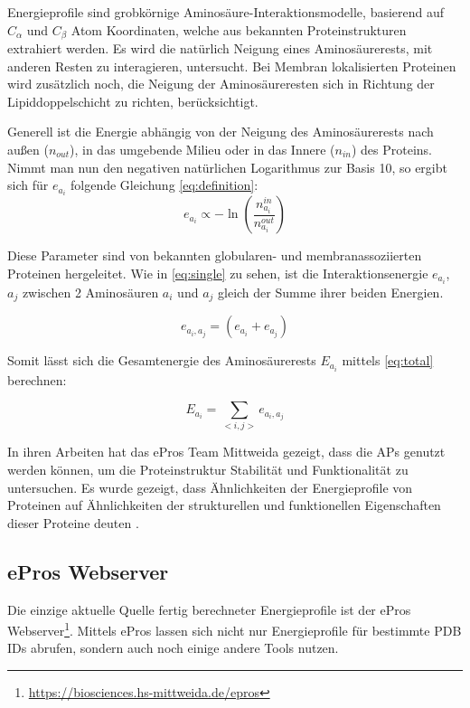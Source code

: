 Energieprofile sind grobkörnige Aminosäure-Interaktionsmodelle, basierend auf $C_{\alpha}$ und $C_{\beta}$ Atom Koordinaten, welche aus bekannten Proteinstrukturen extrahiert werden. Es wird die natürlich Neigung eines Aminosäurerests, mit anderen Resten zu interagieren, untersucht. Bei Membran lokalisierten Proteinen wird zusätzlich noch, die Neigung der Aminosäureresten sich in Richtung der Lipiddoppelschicht zu richten, berücksichtigt. 

Generell ist die Energie abhängig von der Neigung des Aminosäurerests nach außen ($n_{out}$), in das umgebende Milieu oder in das Innere ($n_{in}$) des Proteins. Nimmt man nun den negativen natürlichen Logarithmus zur Basis 10, so ergibt sich für $e_{a_i}$ folgende Gleichung \ref{eq:definition}:
%
\begin{equation}
  	e_{a_i} \propto -\ln{\left(\frac{n_{a_i}^{in}}{n_{a_i}^{out}}\right)}
  	\label{eq:definition}
\end{equation}

Diese Parameter sind von bekannten globularen- und membranassoziierten Proteinen hergeleitet. Wie in \ref{eq:single} zu sehen, ist die Interaktionsenergie $e_{a_{i}}$, $a_{j}$ zwischen 2 Aminosäuren $a_{i}$ und $a_{j}$ gleich der Summe ihrer beiden Energien. 

\begin{equation}
  	e_{a_{i},a_{j}} = \left( e_{a_{i}} + e_{a_{j}} \right)
    \label{eq:single}
\end{equation}

Somit lässt sich die Gesamtenergie des Aminosäurerests $E_{a_i}$ mittels \ref{eq:total} berechnen:

\begin{equation}
    E_{a_{i}} = \sum_{< i, j >}{e_{a_{i},a_{j}}}
    \label{eq:total}
\end{equation}

In ihren Arbeiten hat das ePros Team Mittweida gezeigt, dass die \ac{APs} genutzt werden können, um die Proteinstruktur Stabilität und Funktionalität zu untersuchen. Es wurde gezeigt, dass Ähnlichkeiten der Energieprofile von Proteinen auf Ähnlichkeiten der strukturellen und funktionellen Eigenschaften dieser Proteine deuten \cite{Heinke.2011}.


\subsection{ePros Webserver}
\label{sec:epros}
Die einzige aktuelle Quelle fertig berechneter Energieprofile ist der ePros Webserver\footnote{\url{https://biosciences.hs-mittweida.de/epros}}. Mittels ePros lassen sich nicht nur Energieprofile für bestimmte \ac{PDB} IDs abrufen, sondern auch noch einige andere Tools nutzen.

